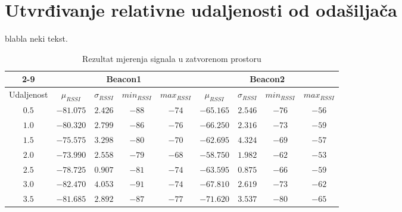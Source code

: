 \section*{Utvrđivanje relativne udaljenosti od odašiljača}

blabla neki tekst.


\begin{table}[H]
    \centering
    \caption{Rezultat mjerenja signala u zatvorenom prostoru}
    \label{tbl:indoor}
	\begin{tabular}{|c|cccc||cccc|}%
	\cline{2-9}
	\multicolumn{1}{!{\vrule width 0pt}c!{\vrule width 1pt}}{} & \multicolumn{4}{c||}{Beacon1} & \multicolumn{4}{c|}{Beacon2} \\ %
	\hline 
	Udaljenost & $\mu_{RSSI}$ & $\sigma_{RSSI}$ & $min_{RSSI}$ & $max_{RSSI}$ & $\mu_{RSSI}$ & $\sigma_{RSSI}$ & $min_{RSSI}$ & $max_{RSSI}$ \\ %
	\hline 
	$0.5$ & $-81.075$ & $2.426$ & $-88$ & $-74$ & $-65.165$ & $2.546$ & $-76$ & $-56$ \\ %
	$1.0$ & $-80.320$ & $2.799$ & $-86$ & $-76$ & $-66.250$ & $2.316$ & $-73$ & $-59$ \\ %
	$1.5$ & $-75.575$ & $3.298$ & $-80$ & $-70$ & $-62.695$ & $4.324$ & $-69$ & $-57$ \\ %
	$2.0$ & $-73.990$ & $2.558$ & $-79$ & $-68$ & $-58.750$ & $1.982$ & $-62$ & $-53$ \\ %
	$2.5$ & $-78.725$ & $0.907$ & $-81$ & $-74$ & $-63.595$ & $0.875$ & $-66$ & $-59$ \\ %
	$3.0$ & $-82.470$ & $4.053$ & $-91$ & $-74$ & $-67.810$ & $2.619$ & $-73$ & $-62$ \\ %
	$3.5$ & $-81.685$ & $2.892$ & $-87$ & $-77$ & $-71.620$ & $3.537$ & $-80$ & $-65$ \\ %

\end{tabular}
\end{table}

